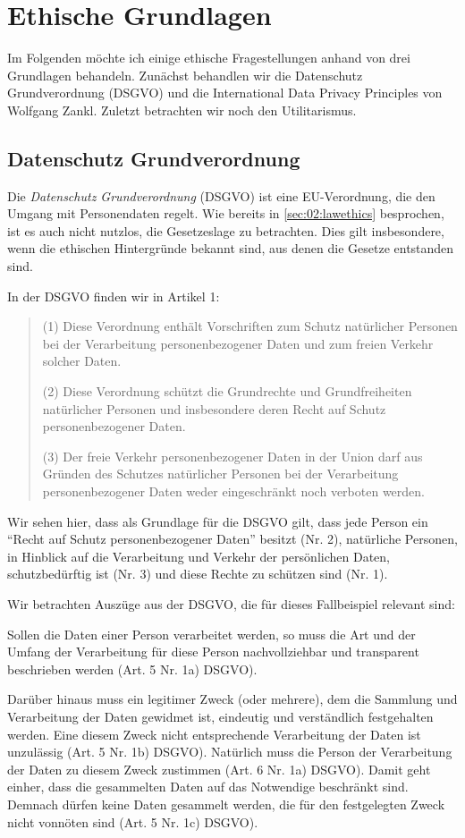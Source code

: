 \section{Ethische Grundlagen}

Im Folgenden möchte ich einige ethische Fragestellungen anhand von drei Grundlagen behandeln.
Zunächst behandlen wir die Datenschutz Grundverordnung (DSGVO) und die International Data Privacy Principles \cite{zankl_international_2014} von Wolfgang Zankl.
Zuletzt betrachten wir noch den Utilitarismus.

\subsection{Datenschutz Grundverordnung}

Die \emph{Datenschutz Grundverordnung} (DSGVO) ist eine EU-Verordnung, die den Umgang mit Personendaten regelt.
Wie bereits in \cref{sec:02:lawethics} besprochen, ist es auch nicht nutzlos, die Gesetzeslage zu betrachten.
Dies gilt insbesondere, wenn die ethischen Hintergründe bekannt sind, aus denen die Gesetze entstanden sind.

In der DSGVO finden wir in Artikel 1:
\blockquote{
    (1) Diese Verordnung enthält Vorschriften zum Schutz natürlicher Personen bei der Verarbeitung personenbezogener Daten und zum freien Verkehr solcher Daten.

    (2) Diese Verordnung schützt die Grundrechte und Grundfreiheiten natürlicher Personen und insbesondere deren Recht auf Schutz personenbezogener Daten.

    (3) Der freie Verkehr personenbezogener Daten in der Union darf aus Gründen des Schutzes natürlicher Personen bei der Verarbeitung personenbezogener Daten weder eingeschränkt noch verboten werden.
}

Wir sehen hier, dass als Grundlage für die DSGVO gilt, dass jede Person ein \enquote{Recht auf Schutz personenbezogener Daten} besitzt (Nr. 2), 
natürliche Personen, in Hinblick auf die Verarbeitung und Verkehr der persönlichen Daten, schutzbedürftig ist (Nr. 3) und diese Rechte zu schützen sind (Nr. 1).

Wir betrachten Auszüge aus der DSGVO, die für dieses Fallbeispiel relevant sind:

Sollen die Daten einer Person verarbeitet werden, so muss die Art und der Umfang der Verarbeitung für diese Person nachvollziehbar und transparent beschrieben werden (Art. 5 Nr. 1a) DSGVO).

Darüber hinaus muss ein legitimer Zweck (oder mehrere), dem die Sammlung und Verarbeitung der Daten gewidmet ist, eindeutig und verständlich festgehalten werden. Eine diesem Zweck nicht entsprechende Verarbeitung der Daten ist unzulässig (Art. 5 Nr. 1b) DSGVO). Natürlich muss die Person der Verarbeitung der Daten zu diesem Zweck zustimmen (Art. 6 Nr. 1a) DSGVO).
Damit geht einher, dass die gesammelten Daten auf das Notwendige beschränkt sind.
Demnach dürfen keine Daten gesammelt werden, die für den festgelegten Zweck nicht vonnöten sind (Art. 5 Nr. 1c) DSGVO).

